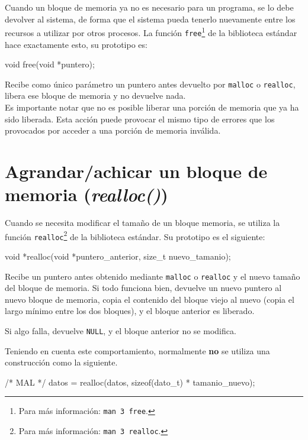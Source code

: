Cuando un bloque de memoria ya no es necesario para un programa, se lo debe
devolver al sistema, de forma que el sistema pueda tenerlo nuevamente entre los
recursos a utilizar por otros procesos. La función
\lstinline!free!\footnote{Para más información: \texttt{man 3 free}.} de la
biblioteca estándar hace exactamente esto, su prototipo es:

\begin{codigo-c-plano}
void free(void *puntero);
\end{codigo-c-plano}

Recibe como único parámetro un puntero antes devuelto por \lstinline!malloc! o
\lstinline!realloc!, libera ese bloque de memoria y no devuelve nada. \\

Es importante notar que no es posible liberar una porción de memoria que ya ha
sido liberada.  Esta acción puede provocar el mismo tipo de errores que los
provocados por acceder a una porción de memoria inválida.

\section{Agrandar/achicar un bloque de memoria (\textit{realloc()})}

Cuando se necesita modificar el tamaño de un bloque memoria, se utiliza la
función \lstinline!realloc!\footnote{Para más información: \texttt{man 3
realloc}.} de la biblioteca estándar. Su prototipo es el siguiente:

\begin{codigo-c-plano}
void *realloc(void *puntero_anterior, size_t nuevo_tamanio);
\end{codigo-c-plano}

Recibe un puntero antes obtenido mediante \lstinline!malloc! o
\lstinline!realloc! y el nuevo tamaño del bloque de memoria. Si todo
funciona bien, devuelve un nuevo puntero al nuevo bloque de memoria, copia el
contenido del bloque viejo al nuevo (copia el largo mínimo entre los dos
bloques), y el bloque anterior es liberado.

Si algo falla, devuelve \lstinline!NULL!, y el bloque anterior no se modifica.

Teniendo en cuenta este comportamiento, normalmente \textbf{no} se utiliza una
construcción como la siguiente.

\begin{codigo-c-plano}
/* MAL */
datos = realloc(datos, sizeof(dato_t) * tamanio_nuevo);
\end{codigo-c-plano}

